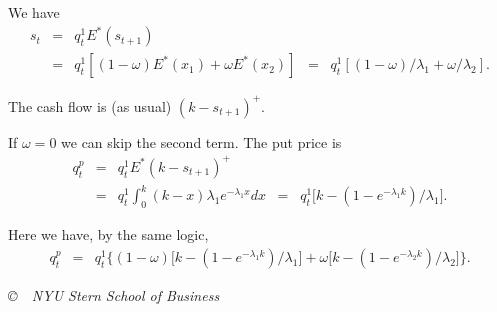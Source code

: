 \documentclass[11pt]{exam}
\begin{document}
\begin{questions}
\begin{solution}
\begin{parts}
\item We have
\begin{eqnarray*}
    s_t &=& q^1_t E^* (s_{t+1}) \\
            &=& q^1_t [(1-\omega) E^*(x_1) + \omega E^*(x_2)]
            \;\;=\;\; q^1_t [(1-\omega)/\lambda_1 + \omega /\lambda_2] .
\end{eqnarray*}
\item The cash flow is (as usual) $ (k-s_{t+1})^+ $.
\item If $\omega=0$ we can skip the second term.
The put price is
\begin{eqnarray*}
    q^p_t &=& q^1_t E^* (k-s_{t+1})^+  \\
            &=& q^1_t \int_{0}^{k} (k-x) \lambda_1 e^{-\lambda_1 x } dx
            \;\;=\;\;  q^1_t \big[ k - ( 1-e^{-\lambda_1 k})/\lambda_1 \big] .
\end{eqnarray*}
\item Here we have, by the same logic,
\begin{eqnarray*}
    q^p_t &=& q^1_t \Big\{
        (1-\omega) \big[ k - ( 1-e^{-\lambda_1 k})/\lambda_1 \big]
        + \omega \big[ k - ( 1-e^{-\lambda_2 k})/\lambda_2 \big]
        \Big\} .
\end{eqnarray*}

\end{parts}
\end{solution}

\end{questions}

\phantom{xx}
\vfill \centerline{\it \copyright \ \number\year \
NYU Stern School of Business}
\end{document}
